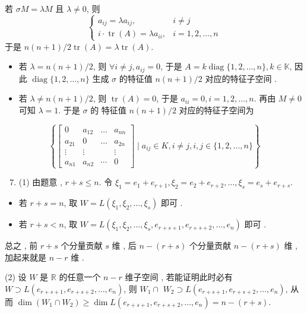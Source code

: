\documentclass[10pt]{article}
\begin{document}
 若  $\sigma M=\lambda M$  且  $\lambda \neq 0$,  则 
$$
\begin{cases}a_{i j}=\lambda a_{i j}, & i \neq j \\ i \cdot \operatorname{tr}(A)=\lambda a_{i i}, & i=1,2, \ldots, n\end{cases}
$$
 于是  $n(n+1) / 2 \operatorname{tr}(A)=\lambda \operatorname{tr}(A)$.

\begin{itemize}
  \item  若  $\lambda=n(n+1) / 2$,  则  $\forall i \neq j, a_{i j}=0$,  于是  $A=k \operatorname{diag}\{1,2, \ldots, n\}, k \in \mathbb{K}$,  因此  $\operatorname{diag}\{1,2, \ldots, n\}$  生成  $\sigma$  的特征值  $n(n+1) / 2$  对应的特征子空间 .

  \item  若  $\lambda \neq n(n+1) / 2$,  则  $\operatorname{tr}(A)=0$,  于是  $a_{i i}=0, i=1,2, \ldots, n$.  再由  $M \neq 0$  可知  $\lambda=1$.  于是  $\sigma$  的   特征值  $n(n+1) / 2$  对应的特征子空间为 

\end{itemize}
$$
\left\{\left[\begin{array}{cccc}
0 & a_{12} & \ldots & a_{n n} \\
a_{21} & 0 & \ldots & a_{2 n} \\
\vdots & \vdots & & \vdots \\
a_{n 1} & a_{n 2} & \cdots & 0
\end{array}\right] \mid a_{i j} \in K, i \neq j, i, j \in\{1,2, \ldots, n\}\right\}
$$

\begin{enumerate}
  \setcounter{enumi}{6}
  \item (1)  由题意 , $r+s \leqslant n$.  令  $\xi_{1}=e_{1}+e_{r+1}, \xi_{2}=e_{2}+e_{r+2}, \ldots, \xi_{s}=e_{s}+e_{r+s}$.
\end{enumerate}
\begin{itemize}
  \item  若  $r+s=n$,  取  $W=L\left(\xi_{1}, \xi_{2}, \ldots, \xi_{s}\right)$  即可 .

  \item  若  $r+s<n$,  取  $W=L\left(\xi_{1}, \xi_{2}, \ldots, \xi_{s}, e_{r+s+1}, e_{r+s+2}, \ldots, e_{n}\right)$  即可 .

\end{itemize}
 总之 ,  前  $r+s$  个分量贡献  $s$  维 ,  后  $n-(r+s)$  个分量贡献  $n-(r+s)$  维 ,  加起来就是  $n-r$  维 .

(2)  设  $W$  是  $\mathbb{R}$  的任意一个  $n-r$  维子空间 ,  若能证明此时必有  $W \supset L\left(e_{r+s+1}, e_{r+s+2}, \ldots, e_{n}\right)$,  则  $W_{1} \cap$ $W_{2} \supset L\left(e_{r+s+1}, e_{r+s+2}, \ldots, e_{n}\right)$,  从而  $\operatorname{dim}\left(W_{1} \cap W_{2}\right) \geqslant \operatorname{dim} L\left(e_{r+s+1}, e_{r+s+2}, \ldots, e_{n}\right)=n-(r+s)$.
\end{document}
